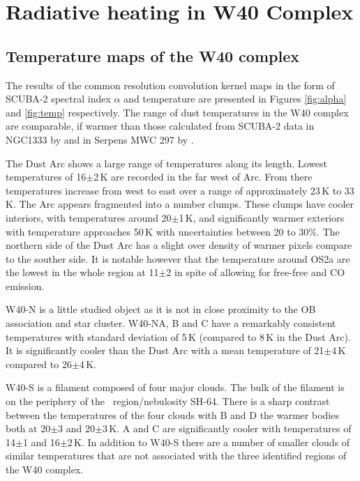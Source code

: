 \chapter{Radiative heating in W40 Complex}
\label{ch:chapter7}

\section{Temperature maps of the W40 complex}
The results of the common resolution convolution kernel maps in the form of SCUBA-2 spectral 
index $\alpha$ and temperature are presented in Figures \ref{fig:alpha} and \ref{fig:temp} respectively. 
The range of dust temperatures in the W40 complex are comparable, if warmer than those calculated from 
SCUBA-2 data in NGC1333 by \cite{Hatchell:2013ij} and in Serpens MWC 297 by \cite{Rumble:2015vn}. 

The Dust Arc shows a large range of temperatures along its length. Lowest temperatures of 16$\pm$2\,K 
are recorded in the far west of Arc. From there temperatures increase from west to east over a range of 
approximately 23\,K to 33\,K. The Arc appears fragmented into a number clumps. These clumps have 
cooler interiors, with temperatures around 20$\pm$1\,K, and significantly warmer exteriors with temperature 
approaches 50\,K with uncertainties between 20 to 30\%. The northern side of the Dust Arc has a slight 
over density of warmer pixels compare to the souther side. It is notable however that the temperature 
around OS2a are the lowest in the whole region at 11$\pm$2 in spite of allowing for free-free and CO 
emission.

W40-N is a little studied object as it is not in close proximity to the OB association and star cluster. 
W40-NA, B and C have a remarkably consistent temperatures with standard deviation of 5\,K 
(compared to 8\,K in the Dust Arc). It is significantly cooler than the Dust Arc with a mean temperature 
of 21$\pm$4\,K compared to 26$\pm$4\,K.

W40-S is a filament composed of four major clouds. The bulk of the filament is on the periphery 
of the \HII\ region/nebulosity SH-64. There is a sharp contrast between the temperatures of the four clouds 
with B and D the warmer bodies both at 20$\pm$3 and 20$\pm$3\,K. A and C are significantly cooler with 
temperatures of 14$\pm$1 and 16$\pm$2\,K. In addition to W40-S there are a number of smaller clouds of 
similar temperatures that are not associated with the three identified regions of the W40 complex.


